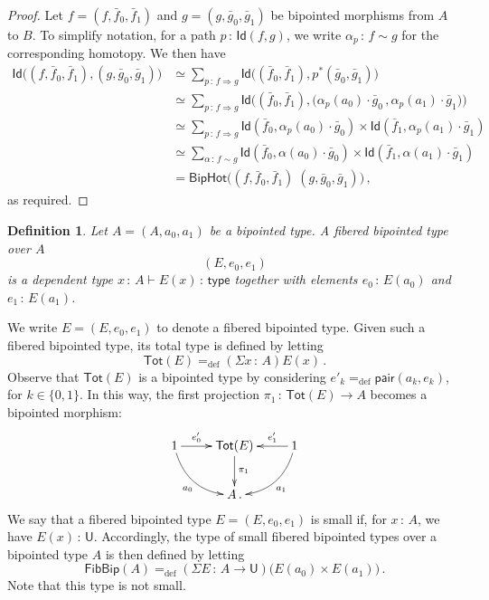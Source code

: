 \documentclass[10pt,a4paper,oneside,reqno]{amsart}
\theoremstyle{mythm}
\theoremstyle{mydef}
\newtheorem{definition}[theorem]{Definition}
\theoremstyle{myrmk}
\newcommand{\defeq}{=_{\mathrm{def}}}
\newcommand{\co}{\,{:}\,}
\newcommand{\type}{\mathsf{type}}
\newcommand{\ct}{\cdot}
\newcommand{\Id}{\mathsf{Id}}
\newcommand{\pair}{\mathsf{pair}}
\newcommand{\U}{\mathsf{U}}
\newcommand{\BipHot}{\mathsf{BipHot}}
\newcommand{\FibBip}{\mathsf{FibBip}}
\newcommand{\Tot}{\mathsf{Tot}}
\begin{document}
\begin{proof} Let  $f = (f, \bar{f}_0, \bar{f}_1)$ and $g = (g, \bar{g}_0, \bar{g}_1)$ be bipointed
morphisms from $A$ to $B$. To simplify notation, for a path $p \co \Id( f, g)$, we write $\alpha_p \co f \sim g$
for the corresponding homotopy. We then have
\begin{align*}
 \Id \big( (f,\bar{f}_0,\bar{f}_1) , (g,\bar{g}_0,\bar{g}_1)  \big)
  &  \simeq \sum_{p \co  f \Rightarrow g} \Id \big(  (\bar{f}_0,\bar{f}_1),  p^{\ast} (\bar{g}_0,\bar{g}_1) \big) \\
  & \simeq
\sum_{p \co f \Rightarrow g} \Id\big( (\bar{f}_0,\bar{f}_1),  \big(\alpha_p(a_0) \ct \bar{g}_0 \, ,  \alpha_p(a_1) \ct \bar{g}_1) \big) \\
& \simeq \sum_{p  \co  f \Rightarrow g} \Id(\bar{f}_0, \alpha_p(a_0) \ct \bar{g}_0) \times \Id( \bar{f}_1, \alpha_p(a_1) \ct \bar{g}_1) \\
& \simeq \sum_{\alpha \co f \sim g} \Id(\bar{f}_0, \alpha(a_0) \ct \bar{g}_0) \times \Id(\bar{f}_1, \alpha(a_1) \ct \bar{g}_1) \\
& = \BipHot \big( (f,\bar{f}_0,\bar{f}_1) \; (g,\bar{g}_0,\bar{g}_1) \big) \, , 
\end{align*} 
as required.
\end{proof}





\begin{definition} \label{def:fibbipointed}
Let $A = (A, a_0, a_1)$ be a bipointed type. A \emph{fibered bipointed type over $A$}
\[
(E, e_0, e_1)
\]  
is a dependent type $x \co A \vdash E(x) \co \type$ together with elements $e_0 \co E(a_0)$ and $e_1 \co E(a_1)$.
\end{definition}

We write $E = (E,e_0, e_1)$ to denote a fibered bipointed type. 
Given such a fibered bipointed type, its total type is defined by letting
\[
\Tot(E)  \defeq (\Sigma x \co A) E(x) \, .
\] 
Observe that $\Tot(E)$ is a bipointed type by considering $e'_k \defeq \pair(a_k, e_k)$, 
for $k \in \{ 0, 1 \}$. In this way, the first projection $\pi_1 \co \Tot(E) \to A$ becomes a bipointed morphism:
\[
\xymatrix{
1 \ar@/_1pc/[dr]_{a_0} \ar[r]^-{e'_0} & \Tot(E) \ar[d]^{\pi_1} & 1 \ar[l]_-{e'_1} \ar@/^1pc/[dl]^{a_1} \\ 
 & A \, .& }
 \]
We say that a fibered bipointed type $E = (E, e_0, e_1)$ is small if, for
$x \co A$, we have $E(x) \co \U$.  Accordingly, the type of  small fibered bipointed types over a bipointed type $A$ is then defined by letting
\[
\FibBip(A) \defeq (\Sigma E \co A \to \U) \big( E(a_0) \times E(a_1) \big) \, .
 \]
 Note that this type is not small. 
\end{document}
